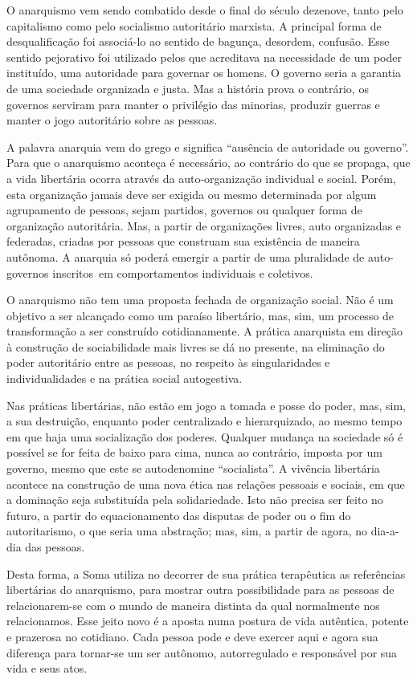 O anarquismo vem sendo combatido desde o final do século dezenove, tanto
pelo capitalismo como pelo socialismo autoritário marxista. A principal
forma de desqualificação foi associá-lo ao sentido de bagunça, desordem,
confusão. Esse sentido pejorativo foi utilizado pelos que acreditava na
necessidade de um poder instituído, uma autoridade para governar os
homens. O governo seria a garantia de uma sociedade organizada e justa.
Mas a história prova o contrário, os governos serviram para manter o
privilégio das minorias, produzir guerras e manter o jogo autoritário
sobre as pessoas.

A palavra anarquia vem do grego e significa ``ausência de autoridade ou
governo''. Para que o anarquismo aconteça é necessário, ao contrário do
que se propaga, que a vida libertária ocorra através da auto-organização
individual e social. Porém, esta organização jamais deve ser exigida ou
mesmo determinada por algum agrupamento de pessoas, sejam partidos,
governos ou qualquer forma de organização autoritária. Mas, a partir de
organizações livres, auto organizadas e federadas, criadas por pessoas
que construam sua existência de maneira autônoma. A anarquia só poderá
emergir a partir de uma pluralidade de auto-governos inscritos~em
comportamentos individuais e coletivos.

O anarquismo não tem uma proposta fechada de organização social. Não é
um objetivo a ser alcançado como um paraíso libertário, mas, sim, um
processo de transformação a ser construído cotidianamente. A prática
anarquista em direção à construção de sociabilidade mais livres se dá no
presente, na eliminação do poder autoritário entre as pessoas, no
respeito às singularidades e individualidades e na prática social
autogestiva.

Nas práticas libertárias, não estão em jogo a tomada e posse do poder,
mas, sim, a sua destruição, enquanto poder centralizado e hierarquizado,
ao mesmo tempo em que haja uma socialização dos poderes. Qualquer
mudança na sociedade só é possível se for feita de baixo para cima,
nunca ao contrário, imposta por um governo, mesmo que este se
autodenomine ``socialista''. A vivência libertária acontece na
construção de uma nova ética nas relações pessoais e sociais, em que a
dominação seja substituída pela solidariedade. Isto não precisa ser
feito no futuro, a partir do equacionamento das disputas de poder ou o
fim do autoritarismo, o que seria uma abstração; mas, sim, a partir de
agora, no dia-a-dia das pessoas.

Desta forma, a Soma utiliza no decorrer de sua prática terapêutica as
referências libertárias do anarquismo, para mostrar outra possibilidade
para as pessoas de relacionarem-se com o mundo de maneira distinta da
qual normalmente nos relacionamos. Esse jeito novo é a aposta numa
postura de vida autêntica, potente e prazerosa no cotidiano. Cada pessoa
pode e deve exercer aqui e agora sua diferença para tornar-se um ser
autônomo, autorregulado e responsável por sua vida e seus atos.

